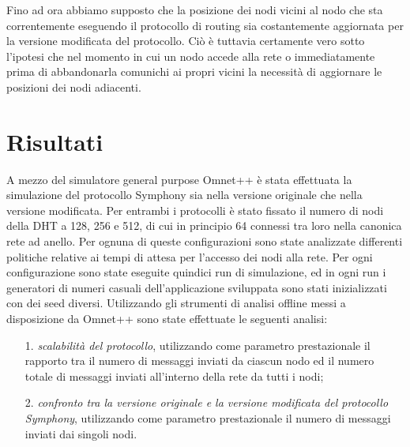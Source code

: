 \documentclass[	
	DIV=calc,
	paper=a4,
	fontsize=11pt,
	onecolumn
]{scrartcl} %
\begin{document}
Fino ad ora abbiamo supposto che la posizione dei nodi vicini al nodo che sta correntemente eseguendo il protocollo di routing sia costantemente aggiornata per la versione modificata del protocollo. Ciò è tuttavia certamente vero sotto l'ipotesi che nel momento in cui un nodo accede alla rete o immediatamente prima di abbandonarla comunichi ai propri vicini la necessità di aggiornare le posizioni dei nodi adiacenti.
\section{Risultati}
A mezzo del simulatore general purpose Omnet++ è stata effettuata la simulazione del protocollo Symphony sia nella versione originale che nella versione modificata. Per entrambi i protocolli è stato fissato il numero di nodi della DHT a 128, 256 e 512, di cui in principio 64 connessi tra loro nella canonica rete ad anello. Per ognuna di queste configurazioni sono state analizzate differenti politiche relative ai tempi di attesa per l'accesso dei nodi alla rete. Per ogni configurazione sono state eseguite quindici run di simulazione, ed in ogni run i generatori di numeri casuali dell'applicazione sviluppata sono stati inizializzati con dei seed diversi. Utilizzando gli strumenti di analisi offline messi a disposizione da Omnet++ sono state effettuate le seguenti analisi:
	\begin{itemize}
	\item[1.] \textit{scalabilità del protocollo}, utilizzando come parametro prestazionale il rapporto tra il numero di messaggi inviati da ciascun nodo ed il numero totale di messaggi inviati all'interno della rete da tutti i nodi;
	\item[2.] \textit{confronto tra la versione originale e la versione modificata del protocollo Symphony}, utilizzando come parametro prestazionale il numero di messaggi inviati dai singoli nodi.
	\end{itemize}
	
\end{document}
